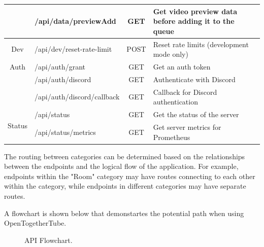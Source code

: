 \begin{table}[htbp]
\begin{tabular}{|c|l|c|p{6.5cm}|}
    \cline{2-4}
    & /api/data/previewAdd & GET & Get video preview data before adding it to the queue \\
    \hline
    \multirow{1}{*}{Dev} & /api/dev/reset-rate-limit & POST & Reset rate limits (development mode only) \\
    \hline
    \multirow{1}{*}{Auth} & /api/auth/grant & GET & Get an auth token \\
    \cline{2-4}
    & /api/auth/discord & GET & Authenticate with Discord \\
    \cline{2-4}
    & /api/auth/discord/callback & GET & Callback for Discord authentication \\
    \hline
    \multirow{2}{*}{Status} & /api/status & GET & Get the status of the server \\
    \cline{2-4}
    & /api/status/metrics & GET & Get server metrics for Prometheus \\
    \hline
  \end{tabular}
\end{table}

The routing between categories can be determined based on the relationships between the endpoints and the logical flow of the application. For example, endpoints within the "Room" category may have routes connecting to each other within the category, while endpoints in different categories may have separate routes. 

A flowchart is shown below that demonstartes the potential path when using OpenTogetherTube.

\begin{figure}[!htb]
  \centering
  \caption{\label{Figure::api-flow} API Flowchart.}
\end{figure}